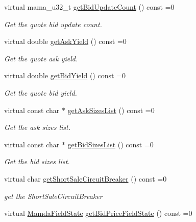 \begin{CompactItemize}
virtual mama\_\-u32\_\-t \hyperlink{classWombat_1_1MamdaQuoteRecap_36e64c863a6c89641b58451c2792744b}{get\-Bid\-Update\-Count} () const =0
\begin{CompactList}\small\item\em Get the quote bid update count. \item\end{CompactList}\item 
virtual double \hyperlink{classWombat_1_1MamdaQuoteRecap_2c27e50701aa2a56fa132d81a6b4be42}{get\-Ask\-Yield} () const =0
\begin{CompactList}\small\item\em Get the quote ask yield. \item\end{CompactList}\item 
virtual double \hyperlink{classWombat_1_1MamdaQuoteRecap_29c021892c5abee2c716d01f15b7b6fe}{get\-Bid\-Yield} () const =0
\begin{CompactList}\small\item\em Get the quote bid yield. \item\end{CompactList}\item 
virtual const char $\ast$ \hyperlink{classWombat_1_1MamdaQuoteRecap_0f3dfc61d4c0ce17a69505bdb0977267}{get\-Ask\-Sizes\-List} () const =0
\begin{CompactList}\small\item\em Get the ask sizes list. \item\end{CompactList}\item 
virtual const char $\ast$ \hyperlink{classWombat_1_1MamdaQuoteRecap_38b96c274919a6554a103604e582ac87}{get\-Bid\-Sizes\-List} () const =0
\begin{CompactList}\small\item\em Get the bid sizes list. \item\end{CompactList}\item 
virtual char \hyperlink{classWombat_1_1MamdaQuoteRecap_b9d92f8b80dfe1efbb6452ce38c192b8}{get\-Short\-Sale\-Circuit\-Breaker} () const =0
\begin{CompactList}\small\item\em get the Short\-Sale\-Circuit\-Breaker \item\end{CompactList}\item 
virtual \hyperlink{namespaceWombat_93aac974f2ab713554fd12a1fa3b7d2a}{Mamda\-Field\-State} \hyperlink{classWombat_1_1MamdaQuoteRecap_a28f3c6d308c9122dd28747c57f89bc8}{get\-Bid\-Price\-Field\-State} () const =0

\end{CompactItemize}
